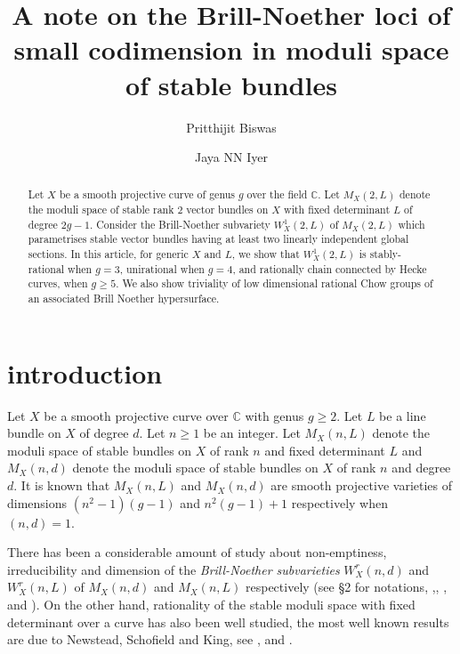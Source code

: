 \documentclass[12pt, reqno]{amsart}
\begin{document}
\title[Brill-Noether loci for moduli space]{A note on the Brill-Noether loci of small codimension in moduli space of stable bundles}
\author[P. Biswas]{Pritthijit Biswas} 
\address{The Institute of Mathematical Sciences (HBNI), C.I.T. Campus, Taramani, Chennai, 600113. Tamil Nadu, India.}
\author[J.N. Iyer]{Jaya NN Iyer}
\address{The Institute of Mathematical Sciences (HBNI), C.I.T. Campus, Taramani, Chennai, 600113. Tamil Nadu, India.}
\begin{abstract}
    Let $X$ be a smooth projective curve of genus $g$ over the field $\mathbb{C}$. Let $M_{X}(2,L)$ denote the moduli space of stable rank $2$ vector bundles on $X$ with fixed determinant $L$ of degree $2g-1$. Consider the Brill-Noether subvariety $W^{1}_{X}(2,L)$ of $M_{X}(2,L)$ which parametrises stable vector bundles having at least two linearly independent global sections. In this article, for generic $X$ and $L$, we show that $W^{1}_{X}(2,L)$ is stably-rational when $g=3$, unirational when $g=4$, and rationally chain connected by Hecke curves, when $g\geq 5$. We also show triviality of low dimensional rational Chow groups of an associated Brill Noether hypersurface.
\end{abstract}
\maketitle
\section{introduction}
Let $X$ be a smooth projective curve over $\mathbb{C}$ with genus $g\geq 2$. Let $L$ be a line bundle on $X$ of degree $d$. Let $n\geq 1$ be an integer. Let $M_{X}(n,L)$ denote the moduli space of stable bundles on $X$ of rank $n$ and fixed determinant $L$ and $M_{X}(n,d)$ denote the moduli space of stable bundles on $X$ of rank $n$ and degree $d$. 
It is known that $M_{X}(n,L)$ and $M_{X}(n,d)$ are smooth projective varieties of dimensions $(n^{2}-1)(g-1)$ and $n^{2}(g-1)+1$ respectively when $(n,d)=1$. 

There has been a considerable amount of study about non-emptiness, irreducibility and dimension of the {\it Brill-Noether subvarieties} $W^{r}_{X}(n,d)$ and $W^{r}_{X}(n,L)$ of $M_{X}(n,d)$ and $M_{X}(n,L)$ respectively (see \S 2 for notations, \cite{bgn},\cite{n1}, \cite{sundaram}, \cite{tb1} and \cite{tb2}). On the other hand, rationality of the stable moduli space with fixed determinant over a curve has also been well studied, the most well known results are due to Newstead, Schofield and King, see \cite{n2},\cite{n3} and \cite{sk}. 
\end{document}
